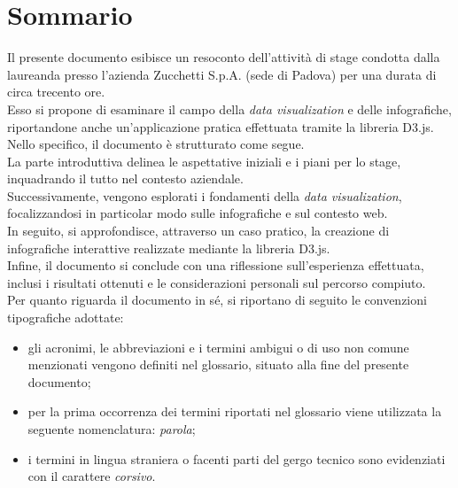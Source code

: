 \cleardoublepage
{}
{}
\begingroup
\let\clearpage\relax
\let\cleardoublepage\relax
\let\cleardoublepage\relax

\chapter*{Sommario}

Il presente documento esibisce un resoconto dell'attività di stage condotta dalla laureanda \myName \space presso 
l'azienda Zucchetti S.p.A. (sede di Padova) per una durata di circa trecento ore.\\

\noindent Esso si propone di esaminare il campo della \emph{data visualization} e delle infografiche, riportandone 
anche un'applicazione pratica effettuata tramite la libreria D3.js. 
\\

\noindent Nello specifico, il documento è strutturato come segue. \\
La parte introduttiva delinea le aspettative iniziali e i piani per lo stage, 
inquadrando il tutto nel contesto aziendale. \\
Successivamente, vengono esplorati i fondamenti della \emph{data visualization}, focalizzandosi in particolar modo 
sulle infografiche e sul contesto web.\\
In seguito, si approfondisce, attraverso un caso pratico, la creazione di infografiche interattive 
realizzate mediante la libreria D3.js.\\
Infine, il documento si conclude con una riflessione sull'esperienza effettuata, inclusi i risultati ottenuti 
e le considerazioni personali sul percorso compiuto.\\

\noindent Per quanto riguarda il documento in sé, si riportano di seguito le convenzioni tipografiche adottate:
\begin{itemize}
    \item gli acronimi, le abbreviazioni e i termini ambigui o di uso non comune menzionati vengono definiti nel glossario, situato alla fine del presente documento;
    \item per la prima occorrenza dei termini riportati nel glossario viene utilizzata la seguente nomenclatura: \emph{parola}\glsfirstoccur;
    \item i termini in lingua straniera o facenti parti del gergo tecnico sono evidenziati con il carattere \emph{corsivo}.
\end{itemize}





\endgroup

\vfill
